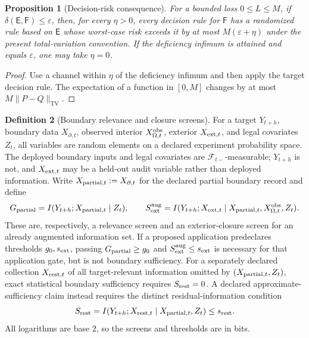 \documentclass[11pt,a4paper]{article}
\theoremstyle{definition}
\newtheorem{definition}{Definition}[section]
\theoremstyle{plain}
\newtheorem{proposition}[definition]{Proposition}
\theoremstyle{remark}
\newcommand{\TV}{\mathrm{TV}}
\begin{document}
\begin{proposition}[Decision-risk consequence]\label{prop:risk}
For a bounded loss \(0\le L\le M\), if
\(\delta(\mathsf E,\mathsf F)\le\varepsilon\), then, for every
\(\eta>0\), every decision rule for
\(\mathsf F\) has a randomized rule based on \(\mathsf E\) whose worst-case
risk exceeds it by at most \(M(\varepsilon+\eta)\) under the present
total-variation convention.  If the deficiency infimum is attained and equals
\(\varepsilon\), one may take \(\eta=0\).
\end{proposition}
\begin{proof}
Use a channel within \(\eta\) of the deficiency infimum and then apply the
target decision rule.  The expectation of a function in \([0,M]\) changes by
at most \(M\|P-Q\|_{\TV}\).
\end{proof}

\begin{definition}[Boundary relevance and closure screens]\label{def:boundarygates}
For a target \(Y_{t+h}\), boundary data \(X_{\partial,t}\), observed interior
\(X_{\Omega,t}^{\rm obs}\), exterior \(X_{{\rm ext},t}\), and legal covariates
\(Z_t\), all variables are random elements on a declared experiment
probability space.  The deployed boundary inputs and legal covariates are
\(\mathcal F_{t-}\)-measurable; \(Y_{t+h}\) is not, and
\(X_{{\rm ext},t}\) may be a held-out audit variable rather than deployed
information.  Write \(X_{{\rm partial},t}:=X_{\partial,t}\) for the declared
partial boundary record and define
\[
G_{\rm partial}
=I(Y_{t+h};X_{{\rm partial},t}\mid Z_t),\qquad
S_{\rm ext}^{\rm aug}
=I(Y_{t+h};X_{{\rm ext},t}\mid
X_{{\rm partial},t},X_{\Omega,t}^{\rm obs},Z_t).
\]
These are, respectively, a relevance screen and an exterior-closure screen
for an already augmented information set.  If a proposed application
predeclares thresholds \(g_0,s_{\rm ext}\), passing
\(G_{\rm partial}\ge g_0\) and
\(S_{\rm ext}^{\rm aug}\le s_{\rm ext}\) is necessary for that application
gate, but is not boundary sufficiency.  For a separately declared collection
\(X_{{\rm rest},t}\) of all target-relevant information omitted by
\((X_{{\rm partial},t},Z_t)\), exact statistical boundary sufficiency requires
\(S_{\rm rest}=0\).  A declared approximate-sufficiency claim instead requires
the distinct residual-information condition
\[
S_{\rm rest}
=I(Y_{t+h};X_{{\rm rest},t}\mid X_{{\rm partial},t},Z_t)
\le s_{\rm rest}.
\]
All logarithms are base \(2\), so the screens and thresholds are in bits.
\end{definition}
\end{document}
